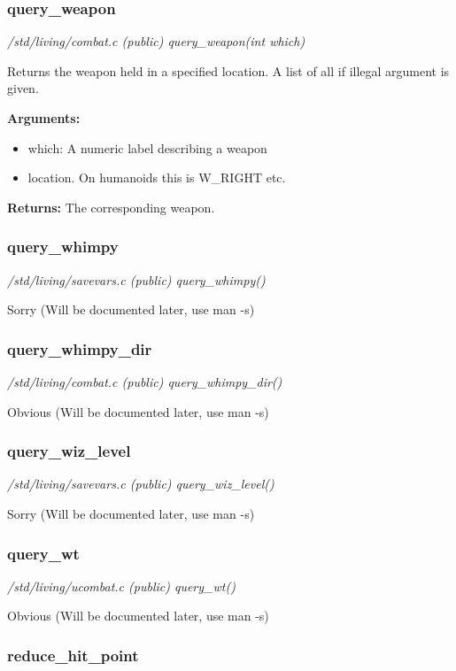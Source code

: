 \subsubsection{query\_weapon}

{\em /std/living/combat.c (public) query\_weapon(int which)}

Returns the weapon held in a specified location.
A list of all if illegal argument is given.

{\bf Arguments:}
\begin{itemize}
\item     which: A numeric label describing a weapon
\item location. On humanoids this is W\_RIGHT etc.
\end{itemize}

{\bf Returns:}        The corresponding weapon.


\subsubsection{query\_whimpy}

{\em /std/living/savevars.c (public) query\_whimpy()}

Sorry (Will be documented later, use man -s)


\subsubsection{query\_whimpy\_dir}

{\em /std/living/combat.c (public) query\_whimpy\_dir()}

Obvious (Will be documented later, use man -s)


\subsubsection{query\_wiz\_level}

{\em /std/living/savevars.c (public) query\_wiz\_level()}

Sorry (Will be documented later, use man -s)


\subsubsection{query\_wt}

{\em /std/living/ucombat.c (public) query\_wt()}

Obvious (Will be documented later, use man -s)


\subsubsection{reduce\_hit\_point}

